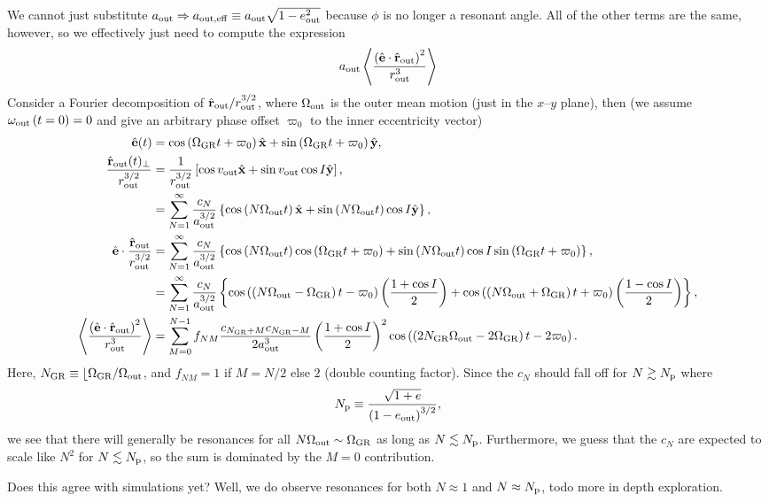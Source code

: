\documentclass[10pt,
        usenames, %
        dvipsnames %
    ]{article}
\newcommand*{\bm}[1]{\boldsymbol{\mathbf{#1}}}
\newcommand*{\uv}[1]{\hat{\bm{#1}}}
\newcommand*{\ev}[1]{\left\langle#1\right\rangle}
\newcommand*{\p}[1]{\left(#1\right)}
\newcommand*{\s}[1]{\left[#1\right]}
\newcommand*{\z}[1]{\left\{#1\right\}}
\begin{document}
We cannot just substitute $a_{\rm out} \Rightarrow a_{\rm out, eff} \equiv
a_{\rm out}\sqrt{1 - e_{\rm out}^2}$ because $\phi$ is no longer a resonant
angle. All of the other terms are the same, however, so we effectively just need
to compute the expression
\begin{equation}
    a_{\rm out}\ev{\frac{\p{\uv{e} \cdot \uv{r}_{\rm out}}^2}{r_{\rm out}^3}}
\end{equation}
Consider a Fourier decomposition of $\uv{r}_{\rm out} / r_{\rm out}^{3/2}$,
where $\Omega_{\rm out}$ is the outer mean motion (just in the $x$--$y$ plane),
then (we assume $\omega_{\rm out}\p{t = 0} = 0$ and give an arbitrary phase
offset $\varpi_0$ to the inner eccentricity vector)
\begin{align}
    \uv{e}(t) &= \cos \p{\Omega_{\rm GR}t + \varpi_0} \uv{x} +
        \sin\p{\Omega_{\rm GR}t + \varpi_0}\uv{y},\\
    \frac{\uv{r}_{\rm out}(t)_{\perp}}{r_{\rm out}^{3/2}} &=
        \frac{1}{r_{\rm out}^{3/2}}\s{\cos v_{\rm out}
            \uv{x} + \sin v_{\rm out}\cos I \uv{y}},\\
        &= \sum\limits_{N = 1}^\infty
            \frac{c_N}{a_{\rm out}^{3/2}}\z{\cos\p{N \Omega_{\rm out}t} \uv{x}
            + \sin\p{N \Omega_{\rm out}t} \cos I\uv{y}},\\
    \uv{e} \cdot \frac{\uv{r}_{\rm out}}{r_{\rm out}^{3/2}}
        &= \sum\limits_{N = 1}^\infty
            \frac{c_N}{a_{\rm out}^{3/2}}
                \z{\cos\p{N \Omega_{\rm out}t} \cos\p{\Omega_{\rm GR}t +
                    \varpi_0}
            + \sin\p{N \Omega_{\rm out}t} \cos I \sin\p{\Omega_{\rm GR}t +
                \varpi_0}},\\
        &= \sum\limits_{N = 1}^\infty
            \frac{c_N}{a_{\rm out}^{3/2}}
                \z{
                    \cos\p{\p{N\Omega_{\rm out} - \Omega_{\rm GR}}t - \varpi_0}
                        \p{\frac{1 + \cos I}{2}}
                    + \cos\p{\p{N\Omega_{\rm out} + \Omega_{\rm GR}}t + \varpi_0}
                        \p{\frac{1 - \cos I}{2}}
                    },\\
    \ev{\frac{\p{\uv{e} \cdot \uv{r}_{\rm out}}^2}{r_{\rm out}^3}}
        &= \sum\limits_{M = 0}^{N - 1}
            f_{NM}
            \frac{c_{N_{\rm GR} + M}c_{N_{\rm GR} - M}}{2a_{\rm out}^3}
            \p{\frac{1 + \cos I}{2}}^2 \cos\p{\p{2N_{\rm GR}\Omega_{\rm out}
                - 2\Omega_{\rm GR}}t - 2\varpi_0}.
\end{align}
Here, $N_{\rm GR} \equiv \lfloor \Omega_{\rm GR} / \Omega_{\rm out}$, and
$f_{NM} = 1$ if $M = N / 2$ else $2$ (double counting factor). Since the $c_N$
should fall off for $N \gtrsim N_{\rm p}$ where
\begin{equation}
    N_{\rm p} \equiv \frac{\sqrt{1 + e}}{\p{1 - e_{\rm out}}^{3/2}},
\end{equation}
we see that there will generally be resonances for all $N\Omega_{\rm out} \sim
\Omega_{\rm GR}$ as long as $N \lesssim N_{\rm p}$. Furthermore, we guess that
the $c_{N}$ are expected to scale like $N^2$ for $N \lesssim N_{\rm p}$, so the
sum is dominated by the $M = 0$ contribution.

Does this agree with simulations yet? Well, we do observe resonances for both $N
\approx 1$ and $N \approx N_{\rm p}$, todo more in depth exploration.
\end{document}
